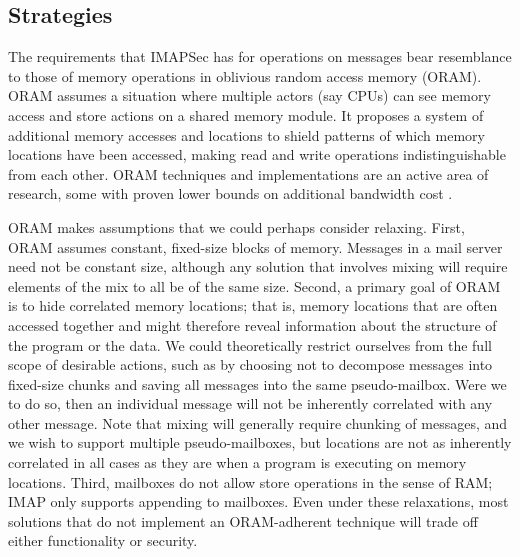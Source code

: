 \documentclass[pageno]{jpaper}
\newcommand{\project}{IMAPSec }
\begin{document}
\subsection{Strategies}
\label{best-metadata}

The requirements that \project has for operations on messages bear resemblance to those of memory operations in oblivious random access memory (ORAM)\cite{oram}. ORAM assumes a situation where multiple actors (say CPUs) can see memory access and store actions on a shared memory module. It proposes a system of additional memory accesses and locations to shield patterns of which memory locations have been accessed, making read and write operations indistinguishable from each other. ORAM techniques and implementations are an active area of research, some with proven lower bounds on additional bandwidth cost \cite{stefanov2013path}.

ORAM makes assumptions that we could perhaps consider relaxing. First, ORAM assumes constant, fixed-size blocks of memory. Messages in a mail server need not be constant size, although any solution that involves mixing will require elements of the mix to all be of the same size. Second, a primary goal of ORAM is to hide correlated memory locations; that is, memory locations that are often accessed together and might therefore reveal information about the structure of the program or the data. We could theoretically restrict ourselves from the full scope of desirable actions, such as by choosing not to decompose messages into fixed-size chunks and saving all messages into the same pseudo-mailbox. Were we to do so, then an individual message will not be inherently correlated with any other message. Note that mixing will generally require chunking of messages, and we wish to support multiple pseudo-mailboxes, but locations are not as inherently correlated in all cases as they are when a program is executing on memory locations. Third, mailboxes do not allow store operations in the sense of RAM; IMAP only supports appending to mailboxes. Even under these relaxations, most solutions that do not implement an ORAM-adherent technique will trade off either functionality or security.
\end{document}
